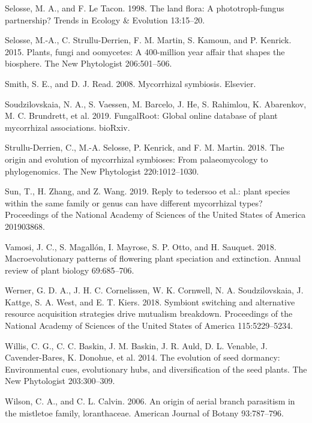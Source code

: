 \documentclass[12pt,]{article}
\begin{document}
\leavevmode\hypertarget{ref-selosse_1998}{}%
Selosse, M. A., and F. Le Tacon. 1998. The land flora: A
phototroph-fungus partnership? Trends in Ecology \& Evolution 13:15--20.

\leavevmode\hypertarget{ref-selosse_2015}{}%
Selosse, M.-A., C. Strullu-Derrien, F. M. Martin, S. Kamoun, and P.
Kenrick. 2015. Plants, fungi and oomycetes: A 400-million year affair
that shapes the biosphere. The New Phytologist 206:501--506.

\leavevmode\hypertarget{ref-smith_2008}{}%
Smith, S. E., and D. J. Read. 2008. Mycorrhizal symbiosis. Elsevier.

\leavevmode\hypertarget{ref-soudzilovskaia_2019}{}%
Soudzilovskaia, N. A., S. Vaessen, M. Barcelo, J. He, S. Rahimlou, K.
Abarenkov, M. C. Brundrett, et al. 2019. FungalRoot: Global online
database of plant mycorrhizal associations. bioRxiv.

\leavevmode\hypertarget{ref-strulluderrien_2018}{}%
Strullu-Derrien, C., M.-A. Selosse, P. Kenrick, and F. M. Martin. 2018.
The origin and evolution of mycorrhizal symbioses: From palaeomycology
to phylogenomics. The New Phytologist 220:1012--1030.

\leavevmode\hypertarget{ref-sun_2019}{}%
Sun, T., H. Zhang, and Z. Wang. 2019. Reply to tedersoo et al.: plant
species within the same family or genus can have different mycorrhizal
types? Proceedings of the National Academy of Sciences of the United
States of America 201903868.

\leavevmode\hypertarget{ref-vamosi_2018}{}%
Vamosi, J. C., S. Magallón, I. Mayrose, S. P. Otto, and H. Sauquet.
2018. Macroevolutionary patterns of flowering plant speciation and
extinction. Annual review of plant biology 69:685--706.

\leavevmode\hypertarget{ref-werner_2018}{}%
Werner, G. D. A., J. H. C. Cornelissen, W. K. Cornwell, N. A.
Soudzilovskaia, J. Kattge, S. A. West, and E. T. Kiers. 2018. Symbiont
switching and alternative resource acquisition strategies drive
mutualism breakdown. Proceedings of the National Academy of Sciences of
the United States of America 115:5229--5234.

\leavevmode\hypertarget{ref-willis_2014}{}%
Willis, C. G., C. C. Baskin, J. M. Baskin, J. R. Auld, D. L. Venable, J.
Cavender-Bares, K. Donohue, et al. 2014. The evolution of seed dormancy:
Environmental cues, evolutionary hubs, and diversification of the seed
plants. The New Phytologist 203:300--309.

\leavevmode\hypertarget{ref-wilson_2006}{}%
Wilson, C. A., and C. L. Calvin. 2006. An origin of aerial branch
parasitism in the mistletoe family, loranthaceae. American Journal of
Botany 93:787--796.
\end{document}
